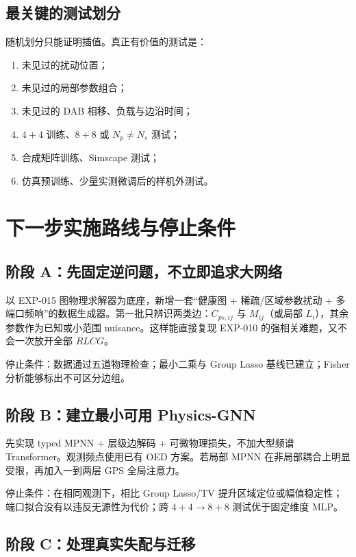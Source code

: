 \documentclass[UTF8,11pt,a4paper]{ctexart}
\begin{document}
\subsection{最关键的测试划分}

随机划分只能证明插值。真正有价值的测试是：
\begin{enumerate}
\item 未见过的扰动位置；
\item 未见过的局部参数组合；
\item 未见过的 DAB 相移、负载与边沿时间；
\item $4+4$ 训练、$8+8$ 或 $N_p\ne N_s$ 测试；
\item 合成矩阵训练、Simscape 测试；
\item 仿真预训练、少量实测微调后的样机外测试。
\end{enumerate}

\section{下一步实施路线与停止条件}

\subsection{阶段 A：先固定逆问题，不立即追求大网络}

以 EXP-015 图物理求解器为底座，新增一套“健康图 + 稀疏/区域参数扰动 + 多端口频响”的数据生成器。第一批只辨识两类边：$C_{ps,ij}$ 与 $M_{ij}$（或局部 $L_i$），其余参数作为已知或小范围 nuisance。这样能直接复现 EXP-010 的强相关难题，又不会一次放开全部 $RLCG$。

停止条件：数据通过五道物理检查；最小二乘与 Group Lasso 基线已建立；Fisher 分析能够标出不可区分边组。

\subsection{阶段 B：建立最小可用 Physics-GNN}

先实现 typed MPNN + 层级边解码 + 可微物理损失，不加大型频谱 Transformer。观测频点使用已有 OED 方案。若局部 MPNN 在非局部耦合上明显受限，再加入一到两层 GPS 全局注意力。

停止条件：在相同观测下，相比 Group Lasso/TV 提升区域定位或幅值稳定性；端口拟合没有以违反无源性为代价；跨 $4+4\to8+8$ 测试优于固定维度 MLP。

\subsection{阶段 C：处理真实失配与迁移}
\end{document}
